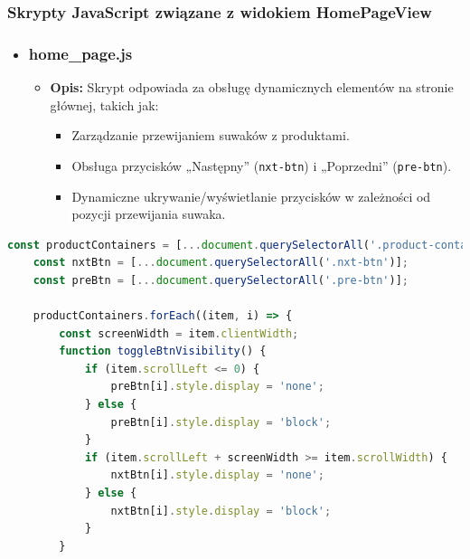 \documentclass[12pt,a4paper,oneside]{article}
\theoremstyle{definition}
\numberwithin{equation}{section}
\begin{document}
\begin{itemize}
        \subsubsection{Skrypty JavaScript związane z widokiem HomePageView}
        \begin{itemize}
            \item \subsubsection*{home\_page.js}
            \begin{itemize}
                \item \textbf{Opis:} Skrypt odpowiada za obsługę dynamicznych elementów na stronie głównej, takich jak:
                \begin{itemize}
                    \item Zarządzanie przewijaniem suwaków z produktami.
                    \item Obsługa przycisków „Następny” (\texttt{nxt-btn}) i „Poprzedni” (\texttt{pre-btn}).
                    \item Dynamiczne ukrywanie/wyświetlanie przycisków w zależności od pozycji przewijania suwaka.
                \end{itemize}
            \end{itemize}
        \end{itemize}
        \begin{lstlisting}[language=JavaScript, caption=Skrypt home\_page.js]
    const productContainers = [...document.querySelectorAll('.product-container')];
    const nxtBtn = [...document.querySelectorAll('.nxt-btn')];
    const preBtn = [...document.querySelectorAll('.pre-btn')];

    productContainers.forEach((item, i) => {
        const screenWidth = item.clientWidth;
        function toggleBtnVisibility() {
            if (item.scrollLeft <= 0) {
                preBtn[i].style.display = 'none';
            } else {
                preBtn[i].style.display = 'block';
            }
            if (item.scrollLeft + screenWidth >= item.scrollWidth) {
                nxtBtn[i].style.display = 'none';
            } else {
                nxtBtn[i].style.display = 'block';
            }
        }


\end{lstlisting}
\end{itemize}
\end{document}
